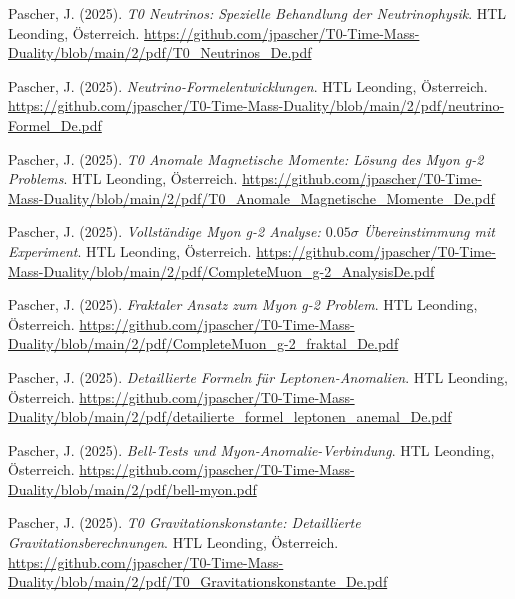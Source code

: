 \documentclass{article}
\begin{document}
\begin{thebibliography}{99}
		Pascher, J. (2025).
		\textit{T0 Neutrinos: Spezielle Behandlung der Neutrinophysik}.
		HTL Leonding, Österreich.
		\url{https://github.com/jpascher/T0-Time-Mass-Duality/blob/main/2/pdf/T0_Neutrinos_De.pdf}
		
		Pascher, J. (2025).
		\textit{Neutrino-Formelentwicklungen}.
		HTL Leonding, Österreich.
		\url{https://github.com/jpascher/T0-Time-Mass-Duality/blob/main/2/pdf/neutrino-Formel_De.pdf}
		
		
		Pascher, J. (2025).
		\textit{T0 Anomale Magnetische Momente: Lösung des Myon g-2 Problems}.
		HTL Leonding, Österreich.
		\url{https://github.com/jpascher/T0-Time-Mass-Duality/blob/main/2/pdf/T0_Anomale_Magnetische_Momente_De.pdf}
		
		Pascher, J. (2025).
		\textit{Vollständige Myon g-2 Analyse: $0.05\sigma$ Übereinstimmung mit Experiment}.
		HTL Leonding, Österreich.
		\url{https://github.com/jpascher/T0-Time-Mass-Duality/blob/main/2/pdf/CompleteMuon_g-2_AnalysisDe.pdf}
		
		Pascher, J. (2025).
		\textit{Fraktaler Ansatz zum Myon g-2 Problem}.
		HTL Leonding, Österreich.
		\url{https://github.com/jpascher/T0-Time-Mass-Duality/blob/main/2/pdf/CompleteMuon_g-2_fraktal_De.pdf}
		
		Pascher, J. (2025).
		\textit{Detaillierte Formeln für Leptonen-Anomalien}.
		HTL Leonding, Österreich.
		\url{https://github.com/jpascher/T0-Time-Mass-Duality/blob/main/2/pdf/detailierte_formel_leptonen_anemal_De.pdf}
		
		Pascher, J. (2025).
		\textit{Bell-Tests und Myon-Anomalie-Verbindung}.
		HTL Leonding, Österreich.
		\url{https://github.com/jpascher/T0-Time-Mass-Duality/blob/main/2/pdf/bell-myon.pdf}
		
		
		Pascher, J. (2025).
		\textit{T0 Gravitationskonstante: Detaillierte Gravitationsberechnungen}.
		HTL Leonding, Österreich.
		\url{https://github.com/jpascher/T0-Time-Mass-Duality/blob/main/2/pdf/T0_Gravitationskonstante_De.pdf}
		

\end{thebibliography}
\end{document}
